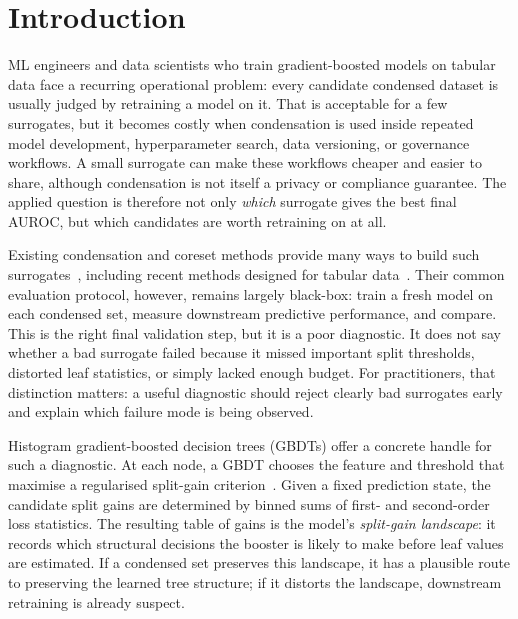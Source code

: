 
\section{Introduction}
\label{sec:intro}

ML engineers and data scientists who train gradient-boosted models on tabular
data face a recurring operational problem: every candidate condensed dataset is
usually judged by retraining a model on it. That is acceptable for a few
surrogates, but it becomes costly when condensation is used inside repeated
model development, hyperparameter search, data versioning, or governance
workflows. A small surrogate can make these workflows cheaper and easier to
share, although condensation is not itself a privacy or compliance guarantee.
The applied question is therefore not only \emph{which} surrogate gives the
best final AUROC, but which candidates are worth retraining on at all.

Existing condensation and coreset methods provide many ways to build such
surrogates~\cite{wang2018datasetdistillation,zhao2021dcgm,welling2009herding,
mirzasoleiman2020craig}, including recent methods designed for tabular
data~\cite{kang2025tabdistill,xu2026c2tc}. Their common evaluation protocol,
however, remains largely black-box: train a fresh model on each condensed set,
measure downstream predictive performance, and compare. This is the right final
validation step, but it is a poor diagnostic. It does not say whether a bad
surrogate failed because it missed important split thresholds, distorted leaf
statistics, or simply lacked enough budget. For practitioners, that distinction
matters: a useful diagnostic should reject clearly bad surrogates early and
explain which failure mode is being observed.

Histogram gradient-boosted decision trees (GBDTs) offer a concrete handle for
such a diagnostic. At each node, a GBDT chooses the feature and threshold that
maximise a regularised split-gain criterion~\cite{friedman2001gbm,
chen2016xgboost,ke2017lightgbm}. Given a fixed prediction state, the candidate
split gains are determined by binned sums of first- and second-order loss
statistics. The resulting table of gains is the model's \emph{split-gain
landscape}: it records which structural decisions the booster is likely to
make before leaf values are estimated. If a condensed set preserves this
landscape, it has a plausible route to preserving the learned tree structure;
if it distorts the landscape, downstream retraining is already suspect.


